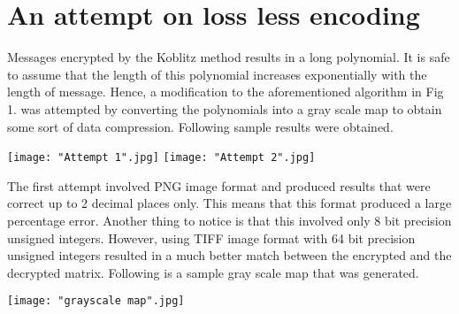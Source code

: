 \documentclass[a4paper,12pt]{article}
\begin{document}


\section{An attempt on loss less encoding}
Messages encrypted by the Koblitz method results in a long polynomial. It is safe to assume that the length of this polynomial increases exponentially with the length of message. Hence, a modification to the aforementioned algorithm in Fig 1. was attempted by converting the polynomials into a gray scale map to obtain some sort of data compression. Following sample results were obtained.

\begin{center}
		\texttt{[image: "Attempt 1".jpg]}
		\texttt{[image: "Attempt 2".jpg]}
\end{center}

\begin{flushleft}
The first attempt involved PNG image format and produced results that were correct up to 2 decimal places only. This means that this format produced a large percentage error. Another thing to notice is that this involved only 8 bit precision unsigned integers. However, using TIFF image format with 64 bit precision unsigned integers resulted in a much better match between the encrypted and the decrypted matrix. Following is a sample gray scale map that was generated.
\end{flushleft}

\begin{center}
	\texttt{[image: "grayscale map".jpg]}
\end{center}
\end{document}
